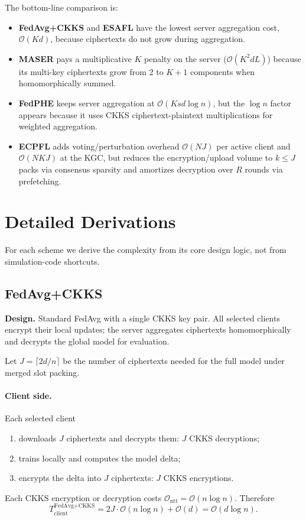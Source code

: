 \documentclass[a4paper,11pt]{article}
\begin{document}
\noindent
The bottom-line comparison is:
\begin{itemize}
    \item \textbf{FedAvg+CKKS} and \textbf{ESAFL} have the lowest server aggregation cost, $\mathcal{O}(Kd)$, because ciphertexts do not grow during aggregation.
    \item \textbf{MASER} pays a multiplicative $K$ penalty on the server ($\mathcal{O}(K^2 dL)$) because its multi-key ciphertexts grow from 2 to $K+1$ components when homomorphically summed.
    \item \textbf{FedPHE} keeps server aggregation at $\mathcal{O}(Ksd\log n)$, but the $\log n$ factor appears because it uses CKKS ciphertext-plaintext multiplications for weighted aggregation.
    \item \textbf{ECPFL} adds voting/perturbation overhead $\mathcal{O}(NJ)$ per active client and $\mathcal{O}(NKJ)$ at the KGC, but reduces the encryption/upload volume to $k\le J$ packs via consensus sparsity and amortizes decryption over $R$ rounds via prefetching.
\end{itemize}

\section{Detailed Derivations}
\label{sec:per-scheme}

For each scheme we derive the complexity from its core design logic, not from simulation-code shortcuts.

\subsection{FedAvg+CKKS}
\label{ssec:fedavg-ckks}

\textbf{Design.} Standard FedAvg with a single CKKS key pair. All selected clients encrypt their local updates; the server aggregates ciphertexts homomorphically and decrypts the global model for evaluation.

Let $J=\lceil 2d/n\rceil$ be the number of ciphertexts needed for the full model under merged slot packing.

\paragraph{Client side.} Each selected client
\begin{enumerate}
    \item downloads $J$ ciphertexts and decrypts them: $J$ CKKS decryptions;
    \item trains locally and computes the model delta;
    \item encrypts the delta into $J$ ciphertexts: $J$ CKKS encryptions.
\end{enumerate}
Each CKKS encryption or decryption costs $\mathcal{O}_{\text{ntt}}=\mathcal{O}(n\log n)$. Therefore
\begin{equation}
\boxed{T_{\text{client}}^{\text{FedAvg+CKKS}} = 2J\cdot\mathcal{O}(n\log n) + \mathcal{O}(d) = \mathcal{O}(d\log n).}
\end{equation}
\end{document}

